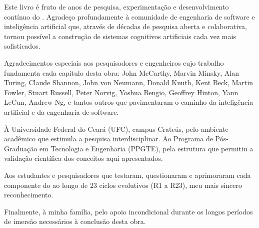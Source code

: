 \begin{agradecimentos}
    \noindent
    Este livro é fruto de anos de pesquisa, experimentação e desenvolvimento 
    contínuo do \opencodeeco{}. Agradeço profundamente à comunidade de 
    engenharia de software e inteligência artificial que, através de décadas 
    de pesquisa aberta e colaborativa, tornou possível a construção de 
    sistemas cognitivos artificiais cada vez mais sofisticados.
    
    Agradecimentos especiais aos pesquisadores e engenheiros cujo trabalho 
    fundamenta cada capítulo desta obra: John McCarthy, Marvin Minsky, 
    Alan Turing, Claude Shannon, John von Neumann, Donald Knuth, Kent Beck, 
    Martin Fowler, Stuart Russell, Peter Norvig, Yoshua Bengio, Geoffrey 
    Hinton, Yann LeCun, Andrew Ng, e tantos outros que pavimentaram o 
    caminho da inteligência artificial e da engenharia de software.
    
    À Universidade Federal do Ceará (UFC), campus Crateús, pelo ambiente 
    acadêmico que estimula a pesquisa interdisciplinar. Ao Programa de 
    Pós-Graduação em Tecnologia e Engenharia (PPGTE), pela estrutura 
    que permitiu a validação científica dos conceitos aqui apresentados.
    
    Aos estudantes e pesquisadores que testaram, questionaram e aprimoraram 
    cada componente do \opencodeeco{} ao longo de 23 ciclos evolutivos 
    (R1 a R23), meu mais sincero reconhecimento.
    
    Finalmente, à minha família, pelo apoio incondicional durante os 
    longos períodos de imersão necessários à conclusão desta obra.
\end{agradecimentos}
